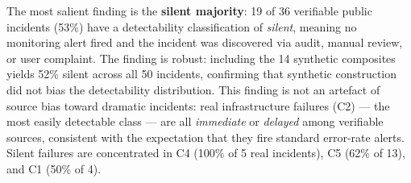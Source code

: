 \documentclass{article}
\begin{document}
\begin{table}[t]
\caption{Dataset statistics by failure class.  ``Real'' = verifiable public
sources (N=36); ``Synth'' = synthetic composites (N=14), included for
class coverage only and excluded from all empirical frequency claims.
C6 is represented entirely by synthetic composites; no publicly reportable
C6-only incident reached the documentation threshold used for real incidents.}
\label{tab:dataset_stats}
\centering
\small
{}
\end{table}

The most salient finding is the \textbf{silent majority}: 19 of 36
verifiable public incidents (53\%) have a detectability classification of
\emph{silent}, meaning no monitoring alert fired and the incident was
discovered via audit, manual review, or user complaint.  The finding is
robust: including the 14 synthetic composites yields 52\% silent across
all 50 incidents, confirming that synthetic construction did not bias the
detectability distribution.  This finding is not an artefact of source
bias toward dramatic incidents: real infrastructure failures (C2) --- the
most easily detectable class --- are all \emph{immediate} or
\emph{delayed} among verifiable sources, consistent with the expectation
that they fire standard error-rate alerts.  Silent failures are
concentrated in C4 (100\% of 5 real incidents), C5 (62\% of 13),
and C1 (50\% of 4).
\end{document}
